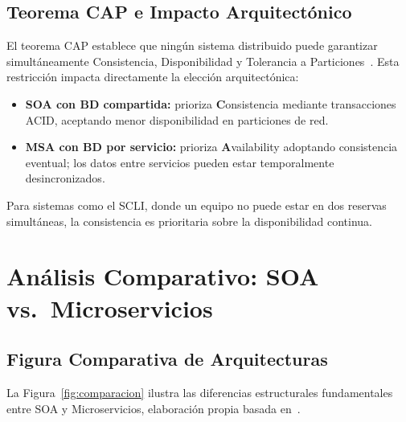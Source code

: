 \documentclass[conference,a4paper]{IEEEtran}
\begin{document}
\subsection{Teorema CAP e Impacto Arquitect\'onico}

El teorema CAP establece que ning\'un sistema distribuido puede
garantizar simult\'aneamente Consistencia, Disponibilidad y
Tolerancia a Particiones~\cite{newman2021}. Esta restricci\'on
impacta directamente la elecci\'on arquitect\'onica:

\begin{itemize}[leftmargin=*]
  \item \textbf{SOA con BD compartida:} prioriza
    \textbf{C}onsistencia mediante transacciones ACID, aceptando
    menor disponibilidad en particiones de red.
  \item \textbf{MSA con BD por servicio:} prioriza
    \textbf{A}vailability adoptando consistencia eventual; los datos
    entre servicios pueden estar temporalmente desincronizados.
\end{itemize}

Para sistemas como el SCLI, donde un equipo no puede estar en
dos reservas simult\'aneas, la consistencia es prioritaria sobre
la disponibilidad continua.

\section{An\'alisis Comparativo: SOA vs.\ Microservicios}
\label{sec:comparacion}

\subsection{Figura Comparativa de Arquitecturas}

La Figura~\ref{fig:comparacion} ilustra las diferencias estructurales
fundamentales entre SOA y Microservicios, elaboraci\'on propia basada
en~\cite{aksakalli2021,newman2021}.
\end{document}
